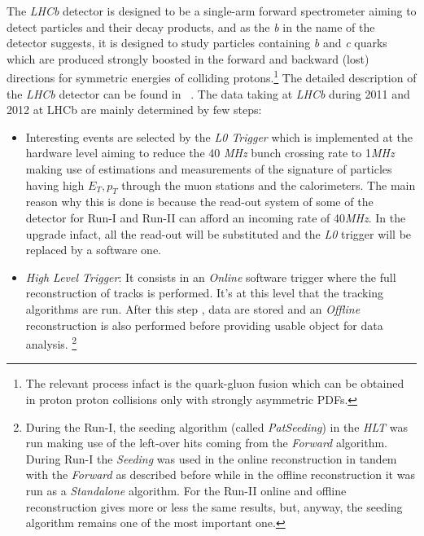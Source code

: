 \documentclass[paper=a4, fontsize=10pt]{scrartcl}
\numberwithin{equation}{section}		%
\numberwithin{figure}{section}			%
\numberwithin{table}{section}				%
\begin{document}
The \textit{LHCb} detector is designed to be a single-arm forward spectrometer aiming to detect particles and their decay products, and as the \textit{b} in the name of the detector suggests, it is designed to study particles containing \textit{b} and \textit{c} quarks which are produced strongly boosted in the forward and backward (lost)  directions for symmetric energies of colliding protons.\footnote{The relevant process infact is the quark-gluon fusion which can be obtained in proton proton collisions only with strongly asymmetric PDFs.}
The detailed description of the \textit{LHCb} detector can be found in ~\cite{Blake1}.
The data taking at \textit{LHCb} during 2011 and 2012 at LHCb are mainly determined by few steps:
\begin{itemize}
\item{Interesting events are selected by the \textit{L0 Trigger} which is implemented at the hardware level aiming to reduce the 40 \textit{MHz} bunch crossing rate to 1\textit{MHz} making use of estimations and measurements of the signature of particles having high $E_{T},p_{T}$ through the muon stations and the calorimeters. The main reason why this is done is because the read-out system of some of the detector for Run-I and Run-II can afford an incoming rate of 40\textit{MHz}. In the upgrade infact, all the read-out will be substituted and the \textit{L0} trigger will be replaced by a software one.}
\item{\textit{High Level Trigger}: It consists in an \textit{Online} software trigger where the full reconstruction of tracks is performed. It's at this level that the tracking algorithms are run. After this step , data are stored and an \textit{Offline} reconstruction is also performed before providing usable object for data analysis. \footnote{During the Run-I, the seeding algorithm (called \textit{PatSeeding}) in the \textit{HLT} was run making use of the left-over hits coming from the \textit{Forward} algorithm. During Run-I the \textit{Seeding} was used in the online reconstruction in tandem with the \textit{Forward} as described before while in the offline reconstruction it was run as a \textit{Standalone} algorithm. For the Run-II online and offline reconstruction gives more or less the same results, but, anyway, the seeding algorithm remains one of the most important one.}}

\end{itemize}
\end{document}
